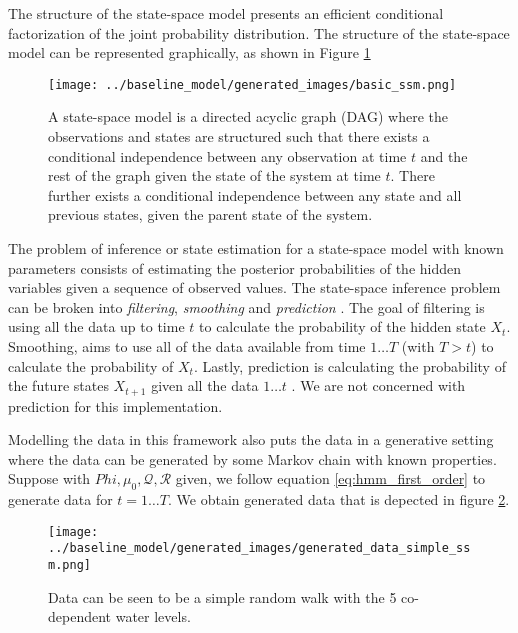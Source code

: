 \documentclass{article}
\begin{document}
The structure of the state-space model presents an efficient conditional factorization of the joint probability distribution. The structure of the state-space model can be represented graphically, as shown in Figure \ref{fig:basic_ssm}

\begin{figure}
\center
\texttt{[image: ../baseline\_model/generated\_images/basic\_ssm.png]}
\caption{A state-space model is a directed acyclic graph (DAG) where the observations and states are structured such that there exists a conditional independence between any observation at time $t$ and the rest of the graph given the state of the system at time $t$. There further exists a conditional independence between any state and all previous states, given the parent state of the system.}\label{fig:basic_ssm}
\end{figure}

The problem of inference or state estimation for a state-space model with known parameters consists of estimating the posterior probabilities of the hidden variables given a sequence of observed values. The state-space inference problem can be broken into \textit{filtering}, \textit{smoothing} and \textit{prediction} \cite{ghahramani2000variational}. The goal of filtering is using all the data up to time $t$ to calculate the probability of the hidden state $X_t$. Smoothing, aims to use all of the data available from time $1 \hdots T$ (with $T > t$) to calculate the probability of $X_t$. Lastly, prediction is calculating the probability of the future states $X_{t+1}$ given all the data $1 \hdots t$ \cite{anderson1979optimal}. We are not concerned with prediction for this implementation.

Modelling the data in this framework also puts the data in a generative setting where the data can be generated by some Markov chain with known properties. Suppose with $Phi, \mu_0, \mathcal{Q}, \mathcal{R}$ given, we follow equation \ref{eq:hmm_first_order} to generate data for $t = 1 \hdots T$. We obtain generated data that is depected in figure \ref{fig:generated_data_simple_ssm}.

\begin{figure}
\center
\texttt{[image: ../baseline\_model/generated\_images/generated\_data\_simple\_ssm.png]}
\caption{Data can be seen to be a simple random walk with the 5 co-dependent water levels.}\label{fig:generated_data_simple_ssm}
\end{figure}
\end{document}
